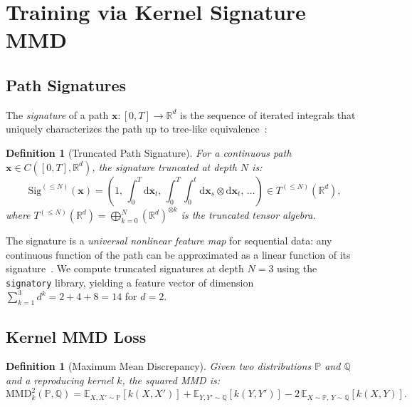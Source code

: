 \documentclass[11pt, a4paper]{article}
\newtheorem{definition}[theorem]{Definition}
\newcommand{\R}{\mathbb{R}}
\newcommand{\E}{\mathbb{E}}
\newcommand{\Prob}{\mathbb{P}}
\newcommand{\Sig}{\mathrm{Sig}}
\newcommand{\MMD}{\mathrm{MMD}}
\newcommand{\dd}{\mathrm{d}}
\begin{document}
\section{Training via Kernel Signature MMD}
\label{sec:training}

\subsection{Path Signatures}

The \emph{signature} of a path $\mathbf{x} : [0, T] \to \R^d$ is the sequence of iterated integrals that uniquely characterizes the path up to tree-like equivalence~\citep{lyons1998differential}:

\begin{definition}[Truncated Path Signature]
For a continuous path $\mathbf{x} \in C([0,T], \R^d)$, the signature truncated at depth $N$ is:
\begin{equation}
    \Sig^{(\leq N)}(\mathbf{x}) = \left(1,\, \int_0^T \dd\mathbf{x}_t,\, \int_0^T \int_0^t \dd\mathbf{x}_s \otimes \dd\mathbf{x}_t,\, \ldots\right) \in T^{(\leq N)}(\R^d),
\end{equation}
where $T^{(\leq N)}(\R^d) = \bigoplus_{k=0}^{N} (\R^d)^{\otimes k}$ is the truncated tensor algebra.
\end{definition}

The signature is a \emph{universal nonlinear feature map} for sequential data: any continuous function of the path can be approximated as a linear function of its signature~\citep{kiraly2019kernels}. We compute truncated signatures at depth $N=3$ using the \texttt{signatory} library, yielding a feature vector of dimension $\sum_{k=1}^{3} d^k = 2 + 4 + 8 = 14$ for $d=2$.

\subsection{Kernel MMD Loss}

\begin{definition}[Maximum Mean Discrepancy]
Given two distributions $\Prob$ and $\mathbb{Q}$ and a reproducing kernel $k$, the squared MMD is:
\begin{equation}
    \MMD^2_k(\Prob, \mathbb{Q}) = \E_{X, X' \sim \Prob}\!\left[k(X, X')\right] + \E_{Y, Y' \sim \mathbb{Q}}\!\left[k(Y, Y')\right] - 2\,\E_{X \sim \Prob,\, Y \sim \mathbb{Q}}\!\left[k(X, Y)\right].
\end{equation}
\end{definition}
\end{document}
